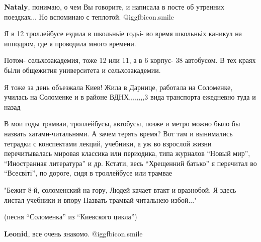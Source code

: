 \begin{itemize}
\begin{itemize} %
\textbf{Nataly}, понимаю, о чем Вы говорите, и написала в посте об утренних поездках... Но вспоминаю с теплотой. @igg{fbicon.smile} 
\end{itemize} %


Я в 12 троллейбусе ездила в школьньіе годьі- во время школьньіх каникул на
ипподром, где я проводила много времени.

Потом- сельхозакадемия, тоже 12 или 11, а в 6 корпус- 38 автобусом. В тех краях
бьіли общежития университета и сельхозакадемии.


Я тоже за день объезжала Киев! Жила в Дарнице, работала на Соломенке, училась
на Соломенке и в районе ВДНХ,,,,,,,,3 вида транспорта ежедневно туда и назад


В мои годы трамваи, троллейбусы, автобусы, позже и метро можно было бы назвать
хатами-читальнями. А зачем терять время? Вот там и вынимались тетрадки с
конспектами лекций, учебники, а уж во взрослой жизни перечитывалась мировая
классика или периодика, типа журналов \enquote{Новый мир}, \enquote{Иностранная литература} и
др. Кстати, весь \enquote{Хрещенний батько} я перечитал во \enquote{Всесвіті}, по дороге, сидя
в троллейбусе или трамвае

\obeycr
"Бежит 8-й, соломенский на гору,
Людей качает втакт и вразнобой.
Я здесь листал учебники и впору
Назвать трамвай читальнею-избой..."
\restorecr

(песня \enquote{Соломенка} из \enquote{Киевского цикла})

\begin{itemize} %
\textbf{Leonid}, все очень знакомо. @igg{fbicon.smile} 
\end{itemize} %


\end{itemize} %

